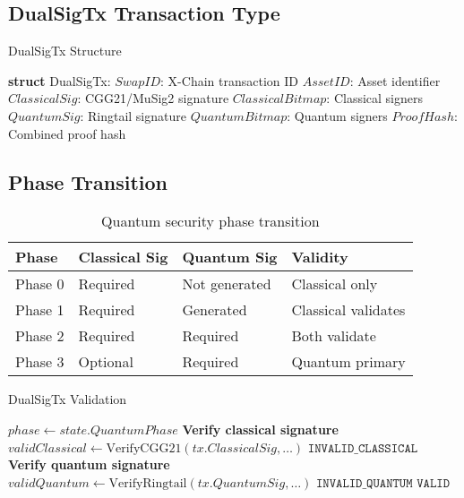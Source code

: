 \documentclass[11pt]{article}
\begin{document}
\subsection{DualSigTx Transaction Type}

\begin{algorithm}[H]
\caption{DualSigTx Structure}
\begin{algorithmic}[1]
\State \textbf{struct} DualSigTx:
\State \quad $SwapID$: X-Chain transaction ID
\State \quad $AssetID$: Asset identifier
\State \quad $ClassicalSig$: CGG21/MuSig2 signature
\State \quad $ClassicalBitmap$: Classical signers
\State \quad $QuantumSig$: Ringtail signature
\State \quad $QuantumBitmap$: Quantum signers
\State \quad $ProofHash$: Combined proof hash
\end{algorithmic}
\end{algorithm}

\subsection{Phase Transition}

\begin{table}[h]
\centering
\begin{tabular}{@{}llll@{}}
\toprule
\textbf{Phase} & \textbf{Classical Sig} & \textbf{Quantum Sig} & \textbf{Validity} \\
\midrule
Phase 0 & Required & Not generated & Classical only \\
Phase 1 & Required & Generated & Classical validates \\
Phase 2 & Required & Required & Both validate \\
Phase 3 & Optional & Required & Quantum primary \\
\bottomrule
\end{tabular}
\caption{Quantum security phase transition}
\label{tab:quantum-phases}
\end{table}

\begin{algorithm}[H]
\caption{DualSigTx Validation}
\begin{algorithmic}[1]
    \State $phase \gets state.QuantumPhase$
    \State
        \State \textbf{Verify classical signature}
        \State $validClassical \gets \text{VerifyCGG21}(tx.ClassicalSig, \ldots)$
            \State \Return $\texttt{INVALID\_CLASSICAL}$
        \EndIf
    \EndIf
    \State
        \State \textbf{Verify quantum signature}
        \State $validQuantum \gets \text{VerifyRingtail}(tx.QuantumSig, \ldots)$
            \State \Return $\texttt{INVALID\_QUANTUM}$
        \EndIf
    \EndIf
    \State
    \State \Return $\texttt{VALID}$
\EndFunction
\end{algorithmic}
\end{algorithm}
\end{document}
